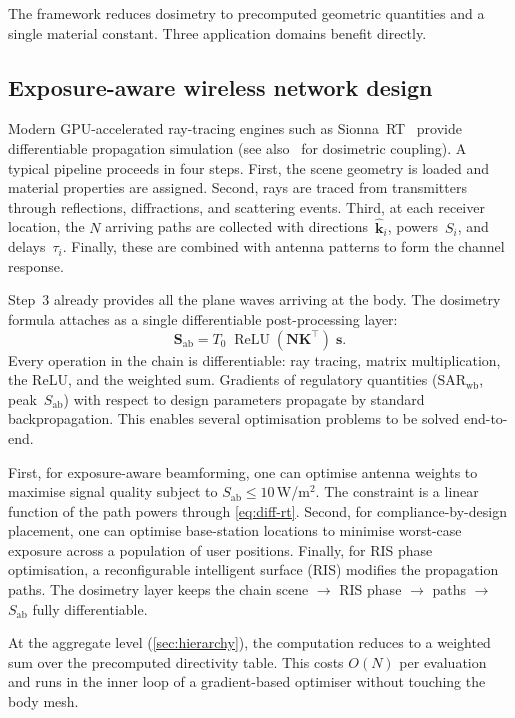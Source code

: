 \documentclass[11pt,a4paper]{article}
\theoremstyle{definition}      %
\newcommand{\khat}{\hat{\bm{k}}}
\newcommand{\Sab}{S_{\mathrm{ab}}}
\newcommand{\SARwb}{\mathrm{SAR}_{\mathrm{wb}}}
\DeclareMathOperator{\ReLU}{ReLU}
\begin{document}
The framework reduces dosimetry to precomputed geometric quantities
and a single material constant.  Three application domains benefit
directly.


\subsection{Exposure-aware wireless network design}
\label{sec:app-network}

Modern GPU-accelerated ray-tracing engines such as
Sionna~RT~\cite{SionnaRT} provide differentiable propagation
simulation (see also~\cite{Shikhantsov2020} for dosimetric
coupling).  A typical pipeline proceeds in four steps.
First, the scene geometry is loaded and material properties are assigned.
Second, rays are traced from transmitters through reflections, diffractions,
and scattering events.
Third, at each receiver location, the $N$ arriving paths are collected with
directions~$\khat_i$, powers~$S_i$, and delays~$\tau_i$.
Finally, these are combined with antenna patterns to form the channel response.

Step~3 already provides all the plane waves arriving at the body.
The dosimetry formula attaches as a single differentiable
post-processing layer:
\begin{equation}\label{eq:diff-rt}
  \mathbf{S}_{\mathrm{ab}}
  = T_0\;\ReLU(\mathbf{N}\mathbf{K}^\top)\;\mathbf{s}.
\end{equation}
Every operation in the chain is differentiable: ray tracing, matrix
multiplication, the ReLU, and the weighted sum.  Gradients of
regulatory quantities ($\SARwb$, peak~$\Sab$) with respect to design
parameters propagate by standard backpropagation.  This enables
several optimisation problems to be solved end-to-end.

First, for exposure-aware beamforming, one can optimise antenna weights
to maximise signal quality subject to $\Sab\le 10$\,W/m$^2$.  The
constraint is a linear function of the path powers through
\cref{eq:diff-rt}.
Second, for compliance-by-design placement, one can optimise base-station
locations to minimise worst-case exposure across a population of
user positions.
Finally, for RIS phase optimisation, a reconfigurable intelligent
surface (RIS) modifies the propagation paths.  The dosimetry layer
keeps the chain scene $\to$ RIS phase $\to$ paths $\to$ $\Sab$
fully differentiable.

At the aggregate level (\cref{sec:hierarchy}), the computation
reduces to a weighted sum over the precomputed directivity table.
This costs $O(N)$ per evaluation and runs in the inner loop of a
gradient-based optimiser without touching the body mesh.
\end{document}
